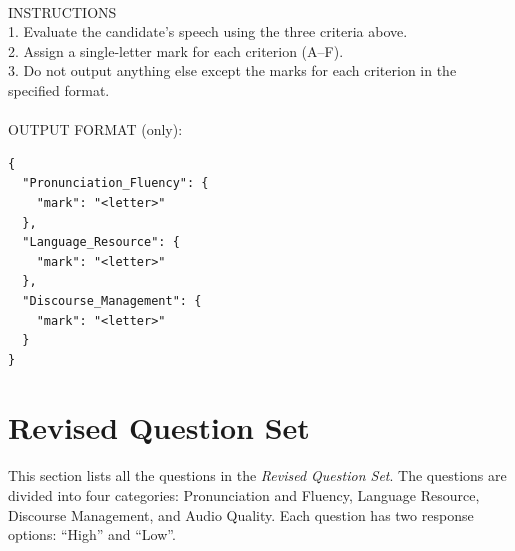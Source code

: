\documentclass{report}
\begin{document}
\begin{tcolorbox}[breakable, colback=white, colframe=black, title=Rubric-based Question Set Batch Prompt]
\\
INSTRUCTIONS\\
1. Evaluate the candidate's speech using the three criteria above.\\
2. Assign a single-letter mark for each criterion (A--F).\\
3. Do not output anything else except the marks for each criterion in the specified format.\\
\\
OUTPUT FORMAT (only):
\begin{verbatim}
{
  "Pronunciation_Fluency": {
    "mark": "<letter>"
  },
  "Language_Resource": {
    "mark": "<letter>"
  },
  "Discourse_Management": {
    "mark": "<letter>"
  }
}
\end{verbatim}
\end{tcolorbox}
\endgroup

\section{Revised Question Set}
\label{app_sec:revised_question_set}
This section lists all the questions in the \emph{Revised Question Set}. The questions are divided into four categories: Pronunciation and Fluency, Language Resource, Discourse Management, and Audio Quality. Each question has two response options: ``High'' and ``Low''.
\end{document}
